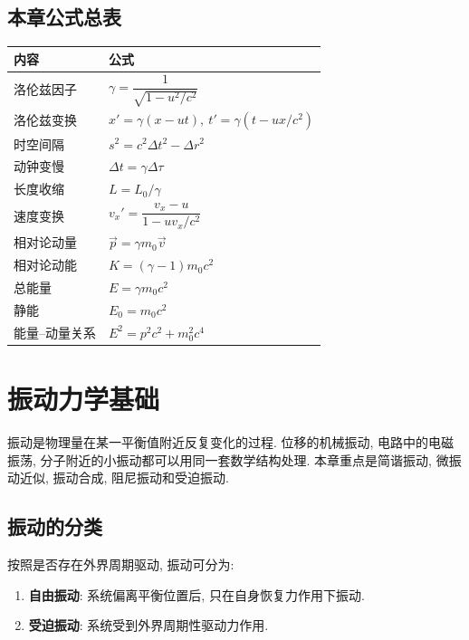 \documentclass[
  a4paper,
]{ctexrep}
\providecommand{\tightlist}{%
  \setlength{\itemsep}{0pt}\setlength{\parskip}{0pt}}
\begin{document}
\section{本章公式总表}\label{ux672cux7ae0ux516cux5f0fux603bux8868}

\begin{longtable}[]{@{}ll@{}}
\toprule\noalign{}
内容 & 公式 \\
\midrule\noalign{}
\endhead
\bottomrule\noalign{}
\endlastfoot
洛伦兹因子 & \(\gamma=\dfrac{1}{\sqrt{1-u^2/c^2}}\) \\
洛伦兹变换 & \(x'=\gamma(x-ut),\ t'=\gamma(t-ux/c^2)\) \\
时空间隔 & \(s^2=c^2\Delta t^2-\Delta r^2\) \\
动钟变慢 & \(\Delta t=\gamma\Delta\tau\) \\
长度收缩 & \(L=L_0/\gamma\) \\
速度变换 & \(v_x'=\dfrac{v_x-u}{1-uv_x/c^2}\) \\
相对论动量 & \(\vec{p}=\gamma m_0\vec{v}\) \\
相对论动能 & \(K=(\gamma-1)m_0c^2\) \\
总能量 & \(E=\gamma m_0c^2\) \\
静能 & \(E_0=m_0c^2\) \\
能量--动量关系 & \(E^2=p^2c^2+m_0^2c^4\) \\
\end{longtable}

\chapter{振动力学基础}\label{ux632fux52a8ux529bux5b66ux57faux7840}

振动是物理量在某一平衡值附近反复变化的过程. 位移的机械振动,
电路中的电磁振荡, 分子附近的小振动都可以用同一套数学结构处理.
本章重点是简谐振动, 微振动近似, 振动合成, 阻尼振动和受迫振动.

\section{振动的分类}\label{ux632fux52a8ux7684ux5206ux7c7b}

按照是否存在外界周期驱动, 振动可分为:

\begin{enumerate}
\def\labelenumi{\arabic{enumi}.}
\tightlist
\item
  \textbf{自由振动}: 系统偏离平衡位置后, 只在自身恢复力作用下振动.
\item
  \textbf{受迫振动}: 系统受到外界周期性驱动力作用.
\end{enumerate}
\end{document}
